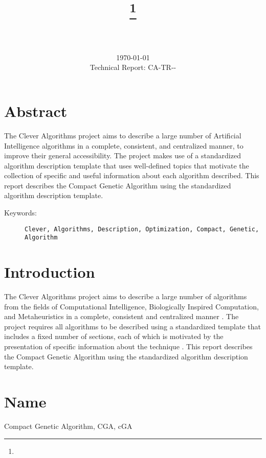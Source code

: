 \documentclass[a4paper, 11pt]{article}
\title{{\myreporttitle}\footnote{\myreportlicense}}
\author{\myreportauthor\\{\myreportemail}\\\small\myreportproject}
\date{\today\\{\small{Technical Report: CA-TR-{\myreportdate}-\myreportversion}}}
\begin{document}
\maketitle

\section*{Abstract} 
The Clever Algorithms project aims to describe a large number of Artificial Intelligence algorithms in a complete, consistent, and centralized manner, to improve their general accessibility. 
The project makes use of a standardized algorithm description template that uses well-defined topics that motivate the collection of specific and useful information about each algorithm described.
This report describes the Compact Genetic Algorithm using the standardized algorithm description template.

\begin{description}
	\item[Keywords:] {\small\texttt{Clever, Algorithms, Description, Optimization, Compact, Genetic, Algorithm}}
\end{description} 

\section{Introduction} 
\label{sec:intro}
The Clever Algorithms project aims to describe a large number of algorithms from the fields of Computational Intelligence, Biologically Inspired Computation, and Metaheuristics in a complete, consistent and centralized manner \cite{Brownlee2010}.
The project requires all algorithms to be described using a standardized template that includes a fixed number of sections, each of which is motivated by the presentation of specific information about the technique \cite{Brownlee2010a}.
This report describes the Compact Genetic Algorithm using the standardized algorithm description template.

\section{Name} 
\label{sec:name}
Compact Genetic Algorithm, CGA, cGA
\end{document}
